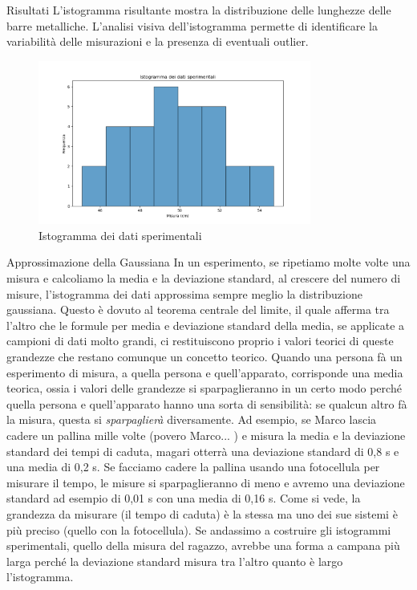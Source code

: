 \documentclass[12pt,a4paper,oneside]{book}
\makeatletter
\renewcommand{\section}{\@startsection{section}{1}{\z@}
{-4ex \@plus -1ex \@minus -.4ex}
{1ex \@plus.2ex }
{\normalfont\large\sffamily\bfseries}}
\renewcommand{\subsection}{\@startsection {subsection}{2}{\z@}
{-3ex \@plus -0.1ex \@minus -.4ex}
{0.5ex \@plus.2ex }
{\color[rgb]{0.141,0.596,0.749}\normalfont\sffamily\bfseries}}
\theoremstyle{esercizio}
\makeatother
\begin{document}
\subsection{Risultati}
L'istogramma risultante mostra la distribuzione delle lunghezze delle barre metalliche. L'analisi visiva dell'istogramma permette di identificare la variabilità delle misurazioni e la presenza di eventuali outlier.

\begin{figure}[!htbp] 
    \centering
    \includegraphics[width=0.8\textwidth]{istogramma2.png}
    \caption{Istogramma dei dati sperimentali}
    \label{fig:istogramma2}
\end{figure}



\section{Approssimazione della Gaussiana}
In un esperimento, se ripetiamo molte volte una misura e calcoliamo la media e la deviazione standard, al crescere del numero di misure, l'istogramma dei dati approssima sempre meglio la distribuzione gaussiana. Questo è dovuto al teorema centrale del limite, il quale afferma tra l'altro che le formule per media e deviazione standard della media, se applicate a campioni di dati molto grandi, ci restituiscono proprio i valori teorici di queste grandezze che restano comunque un concetto teorico. Quando una persona fà un esperimento di misura, a quella persona e quell'apparato, corrisponde una media teorica, ossia i valori delle grandezze si sparpaglieranno in un certo modo perché quella persona e quell'apparato hanno una sorta di sensibilità: se qualcun altro fà la misura, questa si \textit{sparpaglierà} diversamente. Ad esempio, se Marco lascia cadere un pallina mille volte (povero Marco... ) e misura la media e la deviazione standard dei tempi di caduta, magari otterrà una deviazione standard di 0,8 s e una media di 0,2 s. Se facciamo cadere la pallina usando una fotocellula per misurare il tempo, le misure si sparpaglieranno di meno e avremo una deviazione standard ad esempio di 0,01 s con una media di 0,16 s. Come si vede, la grandezza da misurare (il tempo di caduta) è la stessa ma uno dei sue sistemi è più preciso (quello con la fotocellula). Se andassimo a costruire gli istogrammi sperimentali, quello della misura del ragazzo, avrebbe una forma a campana più larga perché la deviazione standard misura tra l'altro quanto è largo l'istogramma. 
\end{document}
